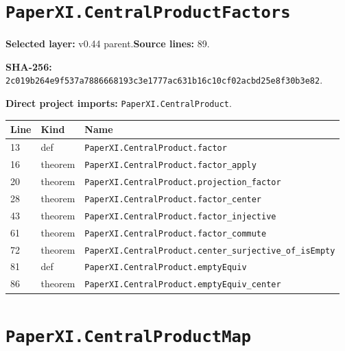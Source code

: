\documentclass[10pt,oneside]{book}
\begin{document}
\section{\texorpdfstring{\nolinkurl{PaperXI.CentralProductFactors}}{PaperXI.CentralProductFactors}}\label{module:PaperXI.CentralProductFactors}

\textbf{Selected layer:} v0.44 parent.\quad\textbf{Source lines:} 89.\par\textbf{SHA-256:} {\scriptsize\nolinkurl{2c019b264e9f537a7886668193c3e1777ac631b16c10cf02acbd25e8f30b3e82}}.


\textbf{Direct project imports:} \nolinkurl{PaperXI.CentralProduct}.

\begin{longtable}{@{}p{}p{}p{}@{}}\toprule Line&Kind&Name\\\midrule\endhead

13&def&\nolinkurl{PaperXI.CentralProduct.factor}\\

16&theorem&\nolinkurl{PaperXI.CentralProduct.factor_apply}\\

20&theorem&\nolinkurl{PaperXI.CentralProduct.projection_factor}\\

28&theorem&\nolinkurl{PaperXI.CentralProduct.factor_center}\\

43&theorem&\nolinkurl{PaperXI.CentralProduct.factor_injective}\\

61&theorem&\nolinkurl{PaperXI.CentralProduct.factor_commute}\\

72&theorem&\nolinkurl{PaperXI.CentralProduct.center_surjective_of_isEmpty}\\

81&def&\nolinkurl{PaperXI.CentralProduct.emptyEquiv}\\

86&theorem&\nolinkurl{PaperXI.CentralProduct.emptyEquiv_center}\\

\bottomrule\end{longtable}

\section{\texorpdfstring{\nolinkurl{PaperXI.CentralProductMap}}{PaperXI.CentralProductMap}}\label{module:PaperXI.CentralProductMap}
\end{document}
